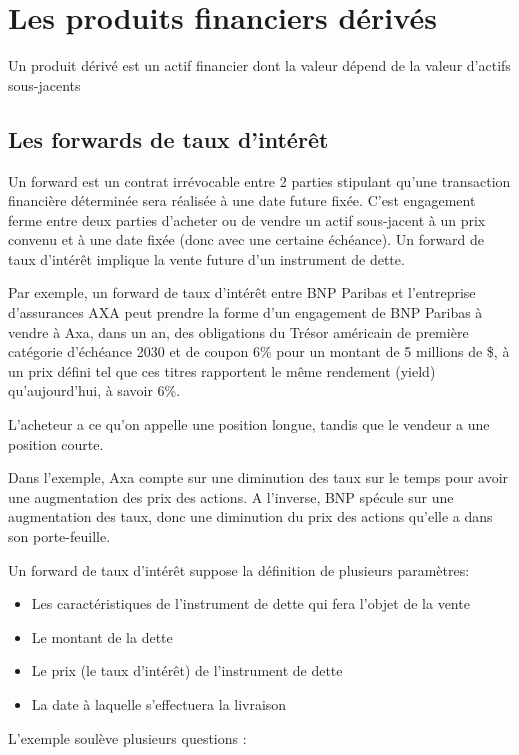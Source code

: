 \chapter{Les produits financiers dérivés}

Un produit dérivé est un actif financier dont la valeur dépend de la valeur d'actifs sous-jacents

\section{Les forwards de taux d'intérêt}

Un forward est un contrat irrévocable entre 2 parties stipulant qu'une transaction financière déterminée sera réalisée à une date future fixée. C'est engagement ferme entre deux parties d'acheter ou de vendre un actif sous-jacent à un prix convenu et à une date fixée (donc avec une certaine échéance). Un forward de taux d'intérêt implique la vente future d'un instrument de dette.

Par exemple, un forward de taux d'intérêt entre BNP Paribas et l'entreprise d'assurances AXA peut prendre la forme d’un engagement de BNP Paribas à vendre à Axa, dans un an, des obligations du Trésor américain de première catégorie d'échéance 2030 et de coupon 6\% pour un montant de 5 millions de \$, à un prix défini tel que ces titres rapportent le même rendement (yield) qu’aujourd'hui, à savoir 6\%. 

L'acheteur a ce qu'on appelle une position longue, tandis que le vendeur a une position courte.

Dans l'exemple, Axa compte sur une diminution des taux sur le temps pour avoir une augmentation des prix des actions. A l'inverse, BNP spécule sur une augmentation des taux, donc une diminution du prix des actions qu'elle a dans son porte-feuille.

Un forward de taux d'intérêt suppose la définition de plusieurs paramètres: 
\begin{itemize}
	\item Les caractéristiques de l'instrument de dette qui fera l'objet de la vente 
	\item Le montant de la dette 
	\item Le prix (le taux d'intérêt) de l'instrument de dette 
	\item La date à laquelle s'effectuera la livraison
\end{itemize}

L'exemple soulève plusieurs questions :

